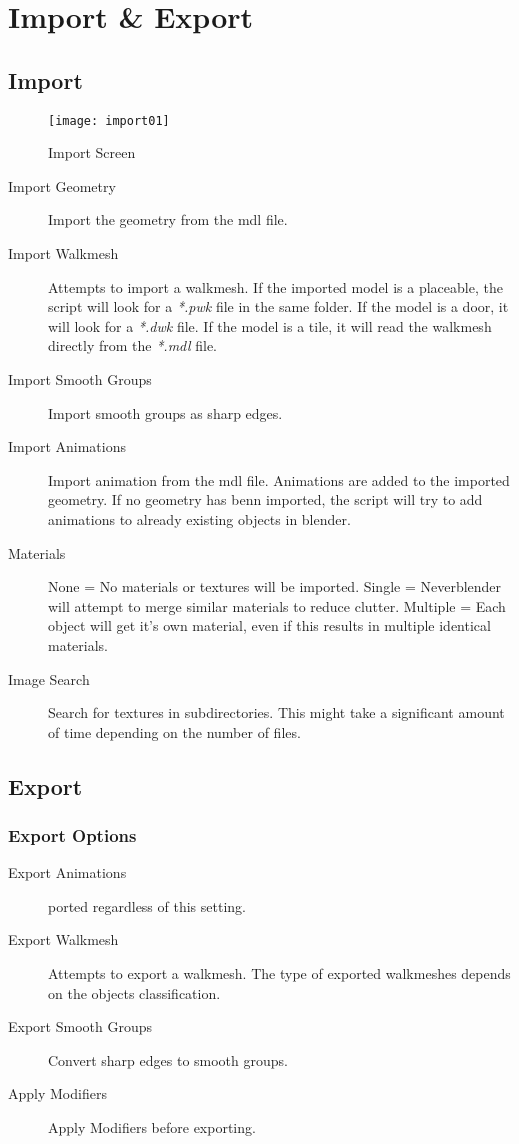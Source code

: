 \section{Import \& Export}

\subsection{Import}

\begin{figure}
  \centering
  \texttt{[image: import01]}
  \caption[mdl import]{Import Screen}
  \label{fig:import01}
\end{figure}

\begin{description}
    \item[Import Geometry] Import the geometry from the mdl file.
    \item[Import Walkmesh] Attempts to import a walkmesh. If the imported model is a placeable, the script will look for a {\textit{*.pwk}} file in the same folder. If the model is a door, it will look for a {\textit{*.dwk}} file. If the model is a tile, it will read the walkmesh directly from the {\textit{*.mdl}} file.
    \item[Import Smooth Groups] Import smooth groups as sharp edges.
    \item[Import Animations] Import animation from the mdl file. Animations are added to the imported geometry. If no geometry has benn imported, the script will try to add animations to already existing objects in blender.
    \item[Materials] None = No materials or textures will be imported. Single = Neverblender will attempt to merge similar materials to reduce clutter. Multiple = Each object will get it's own material, even if this results in multiple identical materials.
    \item[Image Search] Search for textures in subdirectories. This might take a significant amount of time depending on the number of files.
\end{description}


\subsection{Export}

\subsubsection*{Export Options}
\begin{description}
    \item[Export Animations] ported regardless of this setting.
    \item[Export Walkmesh] Attempts to export a walkmesh. The type of exported walkmeshes depends on the objects classification.
    \item[Export Smooth Groups] Convert sharp edges to smooth groups.
    \item[Apply Modifiers] Apply Modifiers before exporting.
\end{description}
